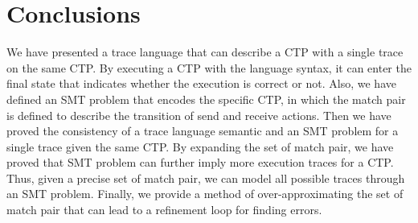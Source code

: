 \section{Conclusions}
We have presented a trace language that can describe a CTP with a single trace on the same CTP. By executing a CTP with the language syntax, it can enter the final state that indicates whether the execution is correct or not. Also, we have defined an SMT problem that encodes the specific CTP, in which the match pair is defined to describe the transition of send and receive actions. Then we have proved the consistency of a trace language semantic and an SMT problem for a single trace given the same CTP. By expanding the set of match pair, we have proved that SMT problem can further imply more execution traces for a CTP. Thus, given a precise set of match pair, we can model all possible traces through an SMT problem. Finally, we provide a method of over-approximating the set of match pair that can lead to a refinement loop for finding errors.  